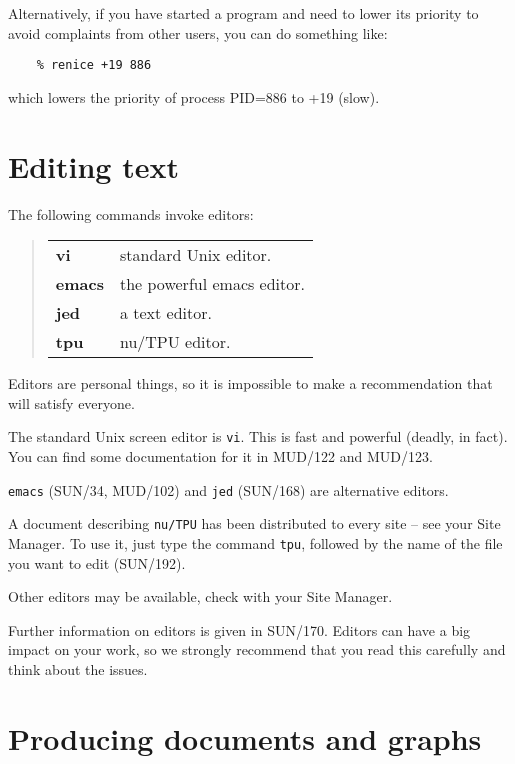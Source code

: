 \documentclass[twoside,11pt]{article}
\newcommand{\xref}[3]{#1}
\begin{document}
Alternatively, if you have started a program and need to lower its priority
to avoid complaints from other users, you can do something like:
\begin{verbatim}
    % renice +19 886
\end{verbatim}
which lowers the priority of process PID=886 to +19 (slow).

\newpage

\section{Editing text}

The following commands invoke editors:
\begin{quote}
\begin{tabular}{lp{67mm}}

{\bf vi}    & standard Unix editor.\\
{\bf emacs} & the powerful emacs editor.\\
{\bf jed}   & a text editor.\\
{\bf tpu}   & nu/TPU editor.

\end{tabular}
\end{quote}
Editors are personal things, so it is impossible to make a recommendation
that will satisfy everyone.

The standard Unix screen editor is {\tt vi}.
This is fast and powerful (deadly, in fact).
You can find some documentation for it in MUD/122 and MUD/123.

{\tt emacs} 
(\xref{SUN/34}{sun34}{}, MUD/102) and {\tt jed}
(\xref{SUN/168}{sun168}{}) are alternative editors.

A document describing {\tt nu/TPU} has been distributed to every site --
see your Site Manager. To use it, just type the command {\tt tpu},
followed by the name of the file you want to edit
(\xref{SUN/192}{sun192}{}).

Other editors may be available, check with your Site Manager.

Further information on editors is given in
\xref{SUN/170}{sun170}{}.
Editors can have a big impact on your work, so we strongly recommend that you
read this carefully and think about the issues.

\newpage

\section{Producing documents and graphs}
\end{document}
